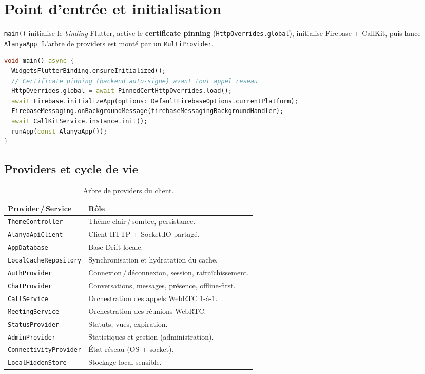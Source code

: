 \documentclass[11pt,a4paper,oneside]{report}
\newcommand{\thd}[1]{\textbf{\textcolor{AlanyaIndigoDark}{#1}}}
\begin{document}
\section{Point d'entr\'{e}e et initialisation}
\texttt{main()} initialise le \emph{binding} Flutter, active le \textbf{certificate
pinning} (\texttt{HttpOverrides.global}), initialise Firebase + CallKit, puis lance
\texttt{AlanyaApp}. L'arbre de providers est mont\'{e} par un \texttt{MultiProvider}.

\begin{lstlisting}[language=Dart,caption={S\'{e}quence d'initialisation (lib/main.dart)},captionpos=b]
void main() async {
  WidgetsFlutterBinding.ensureInitialized();
  // Certificate pinning (backend auto-signe) avant tout appel reseau
  HttpOverrides.global = await PinnedCertHttpOverrides.load();
  await Firebase.initializeApp(options: DefaultFirebaseOptions.currentPlatform);
  FirebaseMessaging.onBackgroundMessage(firebaseMessagingBackgroundHandler);
  await CallKitService.instance.init();
  runApp(const AlanyaApp());
}
\end{lstlisting}

\subsection{Providers et cycle de vie}
\begin{table}[H]
\centering\small
\begin{tabularx}{\linewidth}{@{}l X@{}}
\toprule
\thd{Provider\,/\,Service} & \thd{R\^{o}le}\\
\midrule
\texttt{ThemeController}        & Th\`{e}me clair\,/\,sombre, persistance.\\
\texttt{AlanyaApiClient}        & Client HTTP + Socket.IO partag\'{e}.\\
\texttt{AppDatabase}            & Base Drift locale.\\
\texttt{LocalCacheRepository}   & Synchronisation et hydratation du cache.\\
\texttt{AuthProvider}           & Connexion\,/\,d\'{e}connexion, session, rafra\^{i}chissement.\\
\texttt{ChatProvider}           & Conversations, messages, pr\'{e}sence, offline-first.\\
\texttt{CallService}            & Orchestration des appels WebRTC 1-\`{a}-1.\\
\texttt{MeetingService}         & Orchestration des r\'{e}unions WebRTC.\\
\texttt{StatusProvider}         & Statuts, vues, expiration.\\
\texttt{AdminProvider}          & Statistiques et gestion (administration).\\
\texttt{ConnectivityProvider}   & \'{E}tat r\'{e}seau (OS + socket).\\
\texttt{LocalHiddenStore}       & Stockage local sensible.\\
\bottomrule
\end{tabularx}
\caption{Arbre de providers du client.}
\end{table}
\end{document}
